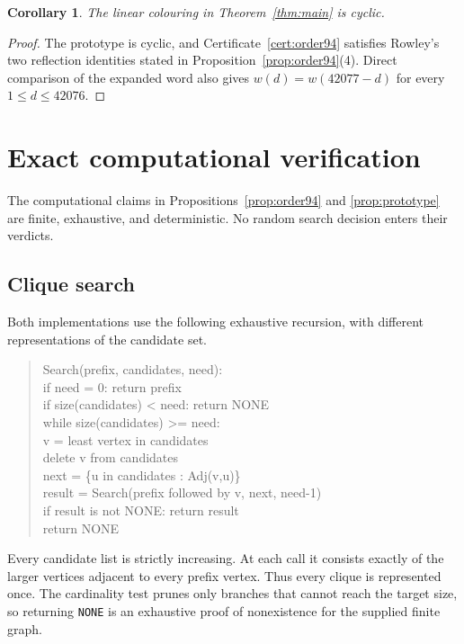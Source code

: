 \documentclass[11pt]{article}
\newtheorem{corollary}[theorem]{Corollary}
\theoremstyle{definition}
\theoremstyle{remark}
\newcommand{\code}[1]{\texttt{#1}}
\begin{document}
\begin{corollary}
The linear colouring in Theorem~\ref{thm:main} is cyclic.
\end{corollary}

\begin{proof}
The prototype is cyclic, and Certificate~\ref{cert:order94} satisfies
Rowley's two reflection identities stated in
Proposition~\ref{prop:order94}(4).  Direct comparison of the expanded word
also gives $w(d)=w(42077-d)$ for every $1\le d\le42076$.
\end{proof}

\section{Exact computational verification}
\label{sec:verification}

The computational claims in Propositions~\ref{prop:order94} and
\ref{prop:prototype} are finite, exhaustive, and deterministic.  No random
search decision enters their verdicts.

\subsection{Clique search}

Both implementations use the following exhaustive recursion, with different
representations of the candidate set.

\begin{quote}
\ttfamily\small
Search(prefix, candidates, need):\\
\phantom{xx}if need = 0: return prefix\\
\phantom{xx}if size(candidates) < need: return NONE\\
\phantom{xx}while size(candidates) >= need:\\
\phantom{xxxx}v = least vertex in candidates\\
\phantom{xxxx}delete v from candidates\\
\phantom{xxxx}next = \{u in candidates : Adj(v,u)\}\\
\phantom{xxxx}result = Search(prefix followed by v, next, need-1)\\
\phantom{xxxx}if result is not NONE: return result\\
\phantom{xx}return NONE
\end{quote}

Every candidate list is strictly increasing.  At each call it consists
exactly of the larger vertices adjacent to every prefix vertex.  Thus every
clique is represented once.  The cardinality test prunes only branches that
cannot reach the target size, so returning \code{NONE} is an exhaustive
proof of nonexistence for the supplied finite graph.
\end{document}
